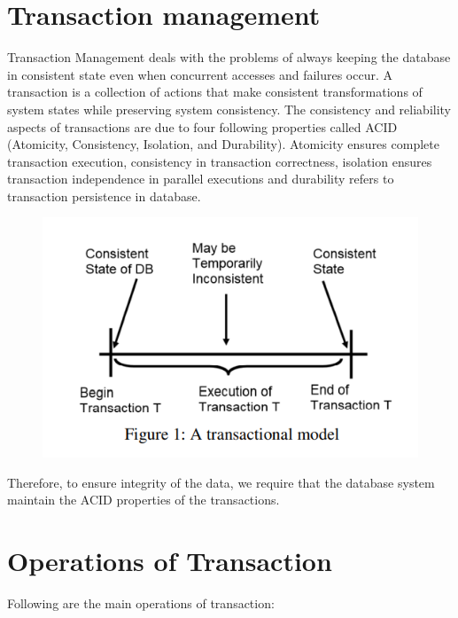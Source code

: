 \documentclass{article}
\begin{document}
\section*{Transaction management}
Transaction Management deals with the problems of always keeping the database in consistent state even when concurrent accesses and failures occur. A transaction is a collection of actions that make consistent transformations of system states while preserving system consistency. The consistency and reliability aspects of transactions are due to four following properties called ACID (Atomicity, Consistency, Isolation, and Durability). Atomicity ensures complete transaction execution, consistency in transaction correctness, isolation ensures transaction independence in parallel executions and durability refers to transaction persistence in database. 

\begin{figure}[h]
 \centering
 \includegraphics{model}
\end{figure}


Therefore, to ensure integrity of the data, we require that the database system maintain the ACID properties of the transactions.

\section*{Operations of Transaction}

Following are the main operations of transaction:
\end{document}
